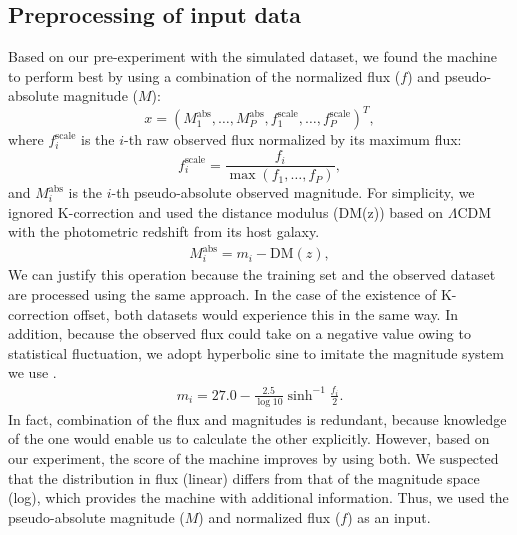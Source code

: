 \documentclass[proof]{pasj01}
\begin{document}
\subsection{Preprocessing of input data}
\label{sec:preproc}
Based on our pre-experiment with the simulated dataset, we found the machine to perform best by using a combination of the normalized flux ($f$) and pseudo-absolute magnitude ($M$):
\begin{equation}
    x = \left( M_1^\mathrm{abs}, \ldots, M_P^\mathrm{abs}, f_{1}^{\mathrm{scale}}, \ldots, f_{P}^{\mathrm{scale}} \right)^T,
\end{equation}
where $f_{i}^{\mathrm{scale}}$ is the $i$-th raw observed flux normalized by its maximum flux:
\begin{equation}
    f_{i}^{\mathrm{scale}} = \frac{f_i}{\max \left(f_1, \ldots, f_P \right)},    \label{eq:scaled_flux}
\end{equation}
and $M_i^\mathrm{abs}$ is the $i$-th pseudo-absolute observed magnitude.
For simplicity, we ignored K-correction and used the distance modulus (DM(z)) based on $\Lambda$CDM with the photometric redshift
from its host galaxy.
\begin{eqnarray}
    M_i^\mathrm{abs} = m_i - \mathrm{DM}\left(z\right),
\end{eqnarray}
We can justify this operation because the training set and the observed dataset are processed using the same approach.
In the case of the existence of K-correction offset, both datasets would experience this in the same way.
In addition, because the observed flux could take on a negative value owing to statistical fluctuation, 
we adopt hyperbolic sine to imitate the magnitude system we use \citep{lupton99a}.  
\begin{eqnarray}
    m_i = 27.0 - \frac{2.5}{\log 10} \sinh^{-1} \frac{f_i}{2}. \label{eq:mag} 
\end{eqnarray}
In fact, combination of the flux and magnitudes is redundant, because knowledge of the one would enable us to calculate the other explicitly.   
However, based on our experiment, the score of the machine improves by using both.  
We suspected that the distribution in flux (linear) differs from that of the magnitude space (log), which provides the machine with additional information.
Thus, we used the pseudo-absolute magnitude ($M$) and normalized flux ($f$) as an input.
\end{document}
